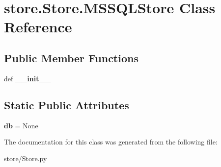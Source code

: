 \hypertarget{classstore_1_1_store_1_1_m_s_s_q_l_store}{\section{store.\-Store.\-M\-S\-S\-Q\-L\-Store Class Reference}
\label{classstore_1_1_store_1_1_m_s_s_q_l_store}
}
\subsection*{Public Member Functions}
\begin{DoxyCompactItemize}
\item 
\hypertarget{classstore_1_1_store_1_1_m_s_s_q_l_store_a936a83c64dbcfc6429f0ca518ea1b4a3}{def {\bfseries \-\_\-\-\_\-init\-\_\-\-\_\-}}\label{classstore_1_1_store_1_1_m_s_s_q_l_store_a936a83c64dbcfc6429f0ca518ea1b4a3}

\end{DoxyCompactItemize}
\subsection*{Static Public Attributes}
\begin{DoxyCompactItemize}
\item 
\hypertarget{classstore_1_1_store_1_1_m_s_s_q_l_store_adac08648d219367b39d399c0f6c82cb8}{{\bfseries db} = None}\label{classstore_1_1_store_1_1_m_s_s_q_l_store_adac08648d219367b39d399c0f6c82cb8}

\end{DoxyCompactItemize}


The documentation for this class was generated from the following file\-:\begin{DoxyCompactItemize}
\item 
store/Store.\-py\end{DoxyCompactItemize}
